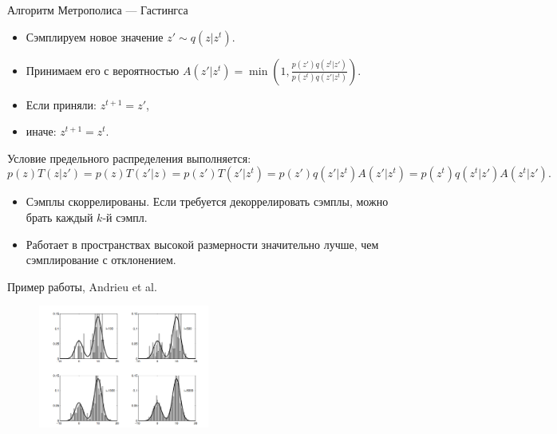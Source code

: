 \begin{frame}{Алгоритм Метрополиса — Гастингса}
\begin{itemize}
\item Сэмплируем новое значение $z' \sim q(z|z^t)$.
\item Принимаем его с вероятностью $A(z'| z^t) = \min\left(1, \frac{p(z')q(z^t|z')}{p(z^t)q(z'|z^t)}\right)$.
\item Если приняли: $z^{t+1} = z'$,
\item иначе: $z^{t+1} = z^t$.
\end{itemize}

Условие предельного распределения выполняется:
\[
    p(z)T(z|z') = p(z)T(z'|z) = p(z')T(z'|z^t) = p(z')q(z'|z^t)A(z'|z^t) = p(z^t)q(z^t|z')A(z^t|z').
\]

\begin{itemize}
\item Сэмплы скоррелированы. Если требуется декоррелировать сэмплы, можно брать каждый $k$-й сэмпл.
\item Работает в пространствах высокой размерности значительно лучше, чем сэмплирование с отклонением.
\end{itemize}
\end{frame}


\begin{frame}{Пример работы,  Andrieu et al.}
\begin{figure}
\centering
\includegraphics[width=0.5\textwidth]{and.png}
\end{figure}
\end{frame}


